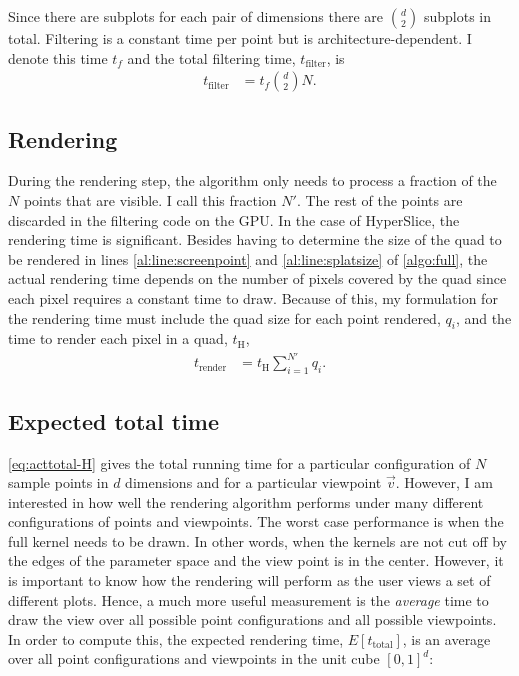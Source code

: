 Since there are subplots for each pair of dimensions there are
${d \choose 2}$ subplots in total. Filtering is a constant time per point
but is
architecture-dependent. I denote this time $t_f$ and the total 
filtering time, $t_\text{filter}$, is
\begin{align}
  t_\text{filter} &= t_f {d \choose 2} N \text{.}
\end{align}

\subsection{Rendering}
\label{rendering}

During the rendering step, the algorithm only needs to process a fraction of the $N$ points
that are visible. I call this fraction $N'$. 
The rest of the points are discarded in the filtering
code on the GPU. In the case of HyperSlice,
the rendering time is significant. Besides having to determine the size of the
quad to be rendered in lines \autoref{al:line:screenpoint} and 
\autoref{al:line:splatsize} of \autoref{algo:full}, the actual rendering
time depends on the number of pixels covered by the quad since each pixel 
requires a constant time to draw. 
Because of this, my formulation for the 
rendering time 
must include the quad size for each point rendered, $q_i$, and
the time to render each pixel in a quad, $t_\text{H}$,
\begin{align}
  t_\text{render} &= t_\text{H} \sum_{i=1}^{N'} q_i \text{.}
\end{align}

\subsection{Expected total time}
\label{sec:expectedtotaltime}

\autoref{eq:acttotal-H} gives the total running time for a
particular configuration of $N$ sample points in $d$ dimensions and for a particular
viewpoint $\vec{v}$. However, I am interested in how well the rendering
algorithm performs under many different configurations of points and 
viewpoints. 
The worst case performance is when the full kernel needs to be drawn.
In other words, when the kernels are not cut off by the edges
of the parameter space and the view point is in the center.
However, it is important to know how the rendering will
perform as the user views a set of different plots.
Hence, a much more
useful measurement is the \emph{average} time to draw the 
view over all possible point configurations and all
possible viewpoints.
In order to compute this, the expected rendering
time, $E[t_\text{total}]$, is an
average over all point configurations and viewpoints in the unit
cube $[0,1]^d$:

